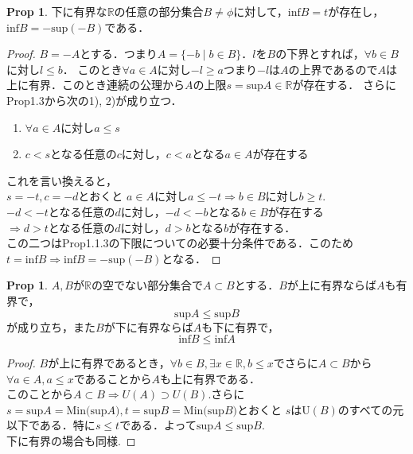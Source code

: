 \documentclass{ltjsarticle}
\theoremstyle{definition}
\newtheorem{prop}[thm]{Prop}
\theoremstyle{propcorollarystyle}
\theoremstyle{thmcorollarystyle}
\begin{document}
\begin{prop}
  下に有界な$\mathbb{R}$の任意の部分集合$B \neq \phi$に対して，$\text{inf}B=t$が存在し，$\text{inf}B=-\text{sup}(-B)$である．
\end{prop}
\begin{proof}
  $B=-A$とする．つまり$A=\{-b \mid b \in B\}$．$l$を$B$の下界とすれば，$\forall b \in B$に対し$l \le b$．
  このとき$\forall a \in A$に対し$-l \ge a$つまり$-l$は$A$の上界であるので$A$は上に有界．このとき連続の公理から$A$の上限$s=\text{sup}A \in \mathbb{R}$が存在する．
  さらにProp1.3から次の1), 2)が成り立つ．
  \begin{enumerate}[label={\arabic*})]
    \item $\forall a \in A$に対し$a \le s$
    \item $c < s$となる任意の$c$に対し，$c < a$となる$a \in A$が存在する
  \end{enumerate}
  これを言い換えると，\\ $s=-t, c=-d$とおくと
  $a \in A$に対し$a \le -t \Rightarrow b \in B$に対し$b \ge t$.\\
  $-d < -t$となる任意の$d$に対し，$-d < -b$となる$b \in B$が存在する\\
  $\Rightarrow d > t$となる任意の$d$に対し，$d>b$となる$b$が存在する．\\
  この二つはProp1.1.3の下限についての必要十分条件である．このため$t=\text{inf}B \Rightarrow \text{inf}B=-\text{sup}(-B)$となる．
\end{proof}

\begin{prop}
  $A, B$が$\mathbb{R}$の空でない部分集合で$A \subset B$とする．$B$が上に有界ならば$A$も有界で，\\
  \[
  \text{sup}A \le \text{sup}B
  \]
  が成り立ち，また$B$が下に有界ならば$A$も下に有界で，\\
  \[
  \text{inf}B \le \text{inf}A
  \]
\end{prop}
\begin{proof}
  $B$が上に有界であるとき，$\forall b \in B, \exists x \in \mathbb{R}, b\le x$でさらに$A \subset B$から$\forall a \in A, a \le x$であることから$A$も上に有界である．\\
  このことから$A \subset B \Rightarrow U(A) \supset U(B)$.さらに$s=\text{sup}A=\text{Min(sup}A), t=\text{sup}B=\text{Min(sup}B)$とおくと
  $s$はU$(B)$のすべての元以下である．特に$s \le t$である．よって$\text{sup}A \le \text{sup}B$.\\
  下に有界の場合も同様.
\end{proof}
\end{document}
